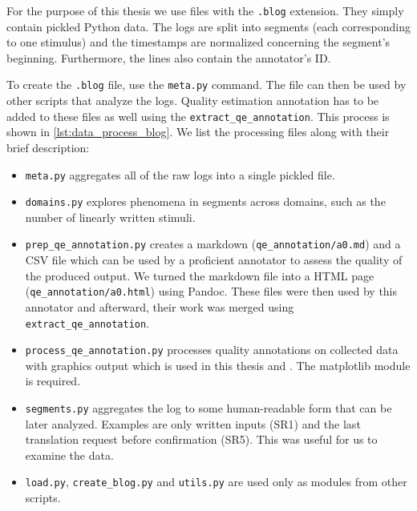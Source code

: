 For the purpose of this thesis we use files with the \texttt{.blog} extension. They simply contain pickled Python data. The logs are split into segments (each corresponding to one stimulus) and the timestamps are normalized concerning the segment's beginning. Furthermore, the lines also contain the annotator's ID.

To create the \texttt{.blog} file, use the \texttt{meta.py} command. The file can then be used by other scripts that analyze the logs. Quality estimation annotation has to be added to these files as well using the \texttt{extract\_qe\_annotation}. This process is shown in \cref{lst:data_process_blog}. We list the processing files along with their brief description:

\begin{itemize}
    \item \texttt{meta.py} aggregates all of the raw logs into a single pickled file.
    \item \texttt{domains.py} explores phenomena in segments across domains, such as the number of linearly written stimuli. 
    \item \texttt{prep\_qe\_annotation.py} creates a markdown (\texttt{qe\_annotation/a0.md}) and a CSV file which can be used by a proficient annotator to assess the quality of the produced output. We turned the markdown file into a HTML page (\texttt{qe\_annotation/a0.html}) using Pandoc. These files were then used by this annotator and afterward, their work was merged using \texttt{extract\_qe\_annotation}. 
    \item \texttt{process\_qe\_annotation.py} processes quality annotations on collected data with graphics output which is used in this thesis and \cite{zouhar:ptakopet}. The matplotlib module is required.
    \item \texttt{segments.py} aggregates the log to some human-readable form that can be later analyzed. Examples are only written inputs (SR1) and the last translation request before confirmation (SR5). This was useful for us to examine the data.
    \item \texttt{load.py}, \texttt{create\_blog.py} and \texttt{utils.py} are used only as modules from other scripts.
\end{itemize}

